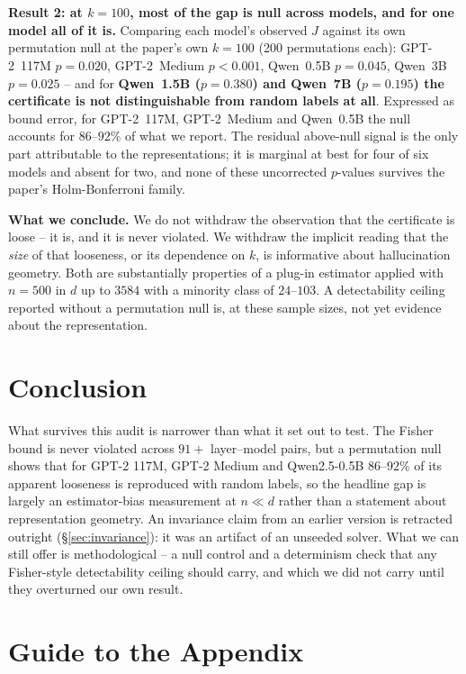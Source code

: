 \documentclass[onecolumn]{jmlr}
\begin{document}
\textbf{Result 2: at $k{=}100$, most of the gap is null across models, and for
one model all of it is.} Comparing each model's observed $\hat J$ against its
own permutation null at the paper's own $k{=}100$ (200 permutations each):
GPT-2~117M $p{=}0.020$, GPT-2~Medium $p{<}0.001$, Qwen~0.5B $p{=}0.045$,
Qwen~3B $p{=}0.025$ -- and for \textbf{Qwen~1.5B ($p{=}0.380$) and Qwen~7B
($p{=}0.195$) the certificate is not distinguishable from random labels at
all}. Expressed as bound error, for GPT-2~117M, GPT-2~Medium and Qwen~0.5B
the null accounts for $86$--$92\%$ of what we report. The residual above-null signal is the only part attributable to the
representations; it is marginal at best for four of six models and absent for
two, and none of these uncorrected $p$-values survives the paper's
Holm-Bonferroni family.

\textbf{What we conclude.} We do not withdraw the observation that the
certificate is loose -- it is, and it is never violated. We withdraw the
implicit reading that the \emph{size} of that looseness, or its dependence on
$k$, is informative about hallucination geometry. Both are substantially
properties of a plug-in estimator applied with $n{=}500$ in $d$ up to $3584$
with a minority class of $24$--$103$. A detectability ceiling reported without
a permutation null is, at these sample sizes, not yet evidence about the
representation.

\section{Conclusion}
\label{sec:conclusion-compact}

What survives this audit is narrower than what it set out to test. The Fisher
bound is never violated across $91+$ layer--model pairs, but a permutation null
shows that for GPT-2 117M, GPT-2 Medium and Qwen2.5-0.5B $86$--$92\%$ of its
apparent looseness is reproduced with random labels,
so the headline gap is largely an estimator-bias measurement at $n{\ll}d$ rather
than a statement about representation geometry. An invariance claim from an
earlier version is retracted outright (\S\ref{sec:invariance}): it was an
artifact of an unseeded solver. What we can still offer is methodological --
a null control and a determinism check that any Fisher-style detectability
ceiling should carry, and which we did not carry until they overturned our own
result.

\clearpage
\appendix

\section*{Guide to the Appendix}
\end{document}
